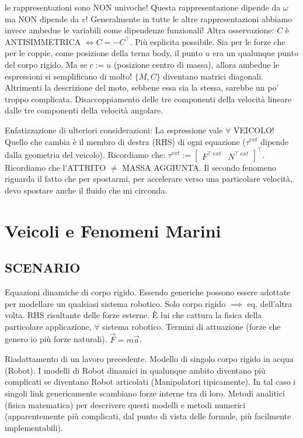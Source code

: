 le rappresentazioni sono NON univoche! Questa rappresentazione dipende da $\omega$ ma NON dipende da $v$! Generalmente in tutte le altre rappresentazioni abbiamo invece ambedue le variabili come dipendenze funzionali! Altra osservazione: $C$ è ANTISIMMETRICA $\iff C=-C^\top$. Più esplicita possibile. Sia per le forze che per le coppie, come posizione della terna body, il punto $u$ era un qualunque punto del corpo rigido. Ma se $c := u$ (posizione centro di massa), allora ambedue le espressioni si semplificano di molto! $\{M,C\}$ diventano matrici diagonali. Altrimenti la descrizione del moto, sebbene essa sia la stessa, sarebbe un po' troppo complicata. Disaccoppiamento delle tre componenti della velocità lineare dalle tre componenti della velocità angolare.

Enfatizzazione di ulteriori considerazioni: La espressione vale $\forall$ VEICOLO! Quello che cambia è il membro di destra (RHS) di ogni equazione ($\tau^{ext}$ dipende dalla geometria del veicolo). Ricordiamo che: $\tau^{ext} := \begin{bmatrix}F^{\top\ ext}&N^{\top\ ext}\end{bmatrix}^\top$. Ricordiamo che l'ATTRITO $\neq$ MASSA AGGIUNTA. Il secondo fenomeno riguarda il fatto che per spostarmi, per accelerare verso una particolare velocità, devo spostare anche il fluido che mi circonda.

\section{Veicoli e Fenomeni Marini}

\subsection{SCENARIO}

Equazioni dinamiche di corpo rigido. Essendo generiche possono essere adottate per modellare un qualsiasi sistema robotico. Solo corpo rigido $\implies$ eq. dell'altra volta. RHS risultante delle forze esterne. \`E lui che cattura la fisica della particolare applicazione, $\forall$ sistema robotico. Termini di attuazione (forze che genero io più forze naturali). $\vec{F}=m\vec{a}$.

Riadattamento di un lavoro precedente. Modello di singolo corpo rigido in acqua (Robot). I modelli di Robot dinamici in qualunque ambito diventano più complicati se diventano Robot articolati (Manipolatori tipicamente). In tal caso i singoli link genericamente scambiano forze interne tra di loro. Metodi analitici (fisica matematica) per descrivere questi modelli e metodi numerici (apparentemente più complicati, dal punto di vista delle formule, più facilmente implementabili).


